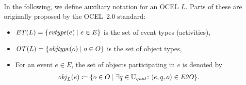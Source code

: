 In the following, we define auxiliary notation for an OCEL $L$. Parts of these are originally proposed by the OCEL~2.0 standard:
\begin{itemize}
  \item $\mathit{ET}(L) = \{\mathit{evtype}(e) \mid e \in E\}$ is the set of event types (activities),
  \item $\mathit{OT}(L) = \{\mathit{objtype}(o) \mid o \in O\}$ is the set of object types,
  \item For an event $e\in E$, the set of objects participating in $e$ is denoted by
  \begin{align*}
    \mathit{obj}_L(e) &\coloneqq \{o \in O \mid \exists q\in\mathbb{U}_{\mathit{qual}}\colon(e, q, o)\in\mathit{E2O} \}.
  \end{align*}
\end{itemize}

